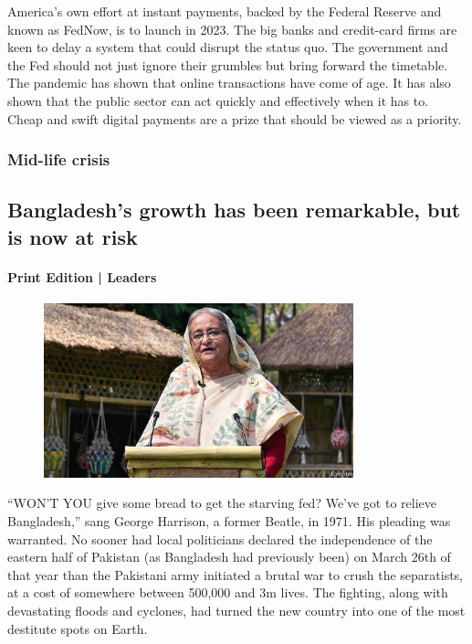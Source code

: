 \documentclass{article}
\begin{document}
America's own effort at instant payments, backed by the Federal Reserve and known as FedNow, is to launch in 2023. The big banks and credit-card firms are keen to delay a system that could disrupt the status quo. The government and the Fed should not just ignore their grumbles but bring forward the timetable. The pandemic has shown that online transactions have come of age. It has also shown that the public sector can act quickly and effectively when it has to. Cheap and swift digital payments are a prize that should be viewed as a priority. {} 
\clearpage
\subsubsection{Mid-life crisis }
\subsection{Bangladesh's growth has been remarkable, but is now at risk }
\paragraph{Print Edition | Leaders  \quad \color{gray}{Mar 25th 2021 }}
\begin{figure}[h]
\centering
\includegraphics[width=0.8\textwidth]{images/20210327_LDP001_0.jpg}
\end{figure}
\lettrine{``W}ON'T YOU give some bread to get the starving fed? We've got to relieve Bangladesh,'' sang George Harrison, a former Beatle, in 1971. His pleading was warranted. No sooner had local politicians declared the independence of the eastern half of Pakistan (as Bangladesh had previously been) on March 26th of that year than the Pakistani army initiated a brutal war to crush the separatists, at a cost of somewhere between 500,000 and 3m lives. The fighting, along with devastating floods and cyclones, had turned the new country into one of the most destitute spots on Earth. 
\end{document}
